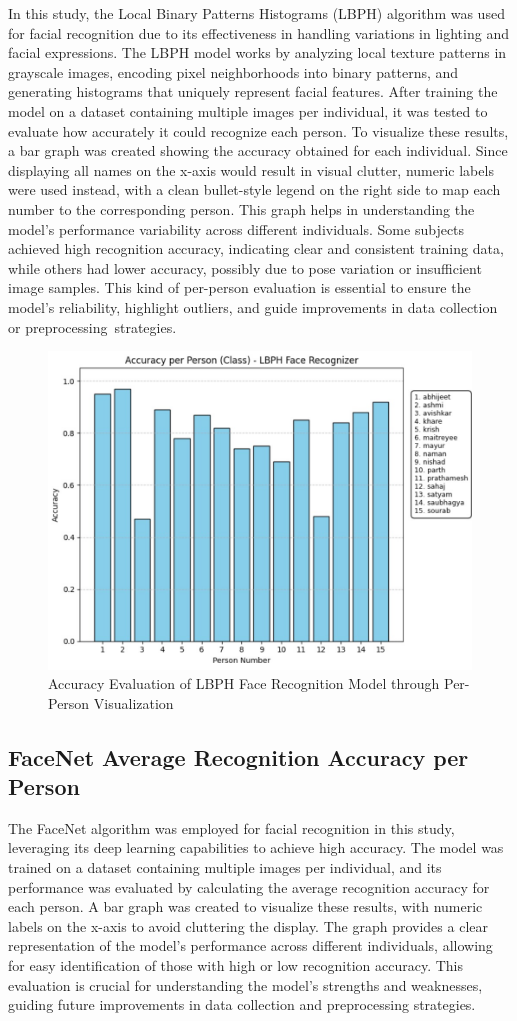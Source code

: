\documentclass[conference]{IEEEtran}
\begin{document}
In this study, the Local Binary Patterns Histograms (LBPH) algorithm was used for facial recognition due to its effectiveness in handling variations in lighting and facial expressions. The LBPH model works by analyzing local texture patterns in grayscale images, encoding pixel neighborhoods into binary patterns, and generating histograms that uniquely represent facial features. After training the model on a dataset containing multiple images per individual, it was tested to evaluate how accurately it could recognize each person. To visualize these results, a bar graph was created showing the accuracy obtained for each individual. Since displaying all names on the x-axis would result in visual clutter, numeric labels were used instead, with a clean bullet-style legend on the right side to map each number to the corresponding person. This graph helps in understanding the model's performance variability across different individuals. Some subjects achieved high recognition accuracy, indicating clear and consistent training data, while others had lower accuracy, possibly due to pose variation or insufficient image samples. This kind of per-person evaluation is essential to ensure the model's reliability, highlight outliers, and guide improvements in data collection or preprocessing strategies.
\begin{figure}[h]
    \centering
    \includegraphics[width=.45\textwidth]{accuracy per person.jpg}
    \caption{Accuracy Evaluation of LBPH Face Recognition Model through Per-Person Visualization}
    \label{fig:Accuracy per Person (Class) - LBPH Face Recognizer}
\end{figure}
\subsection{FaceNet Average Recognition Accuracy per Person }

The FaceNet algorithm was employed for facial recognition in this study, leveraging its deep learning capabilities to achieve high accuracy. The model was trained on a dataset containing multiple images per individual, and its performance was evaluated by calculating the average recognition accuracy for each person. A bar graph was created to visualize these results, with numeric labels on the x-axis to avoid cluttering the display. The graph provides a clear representation of the model's performance across different individuals, allowing for easy identification of those with high or low recognition accuracy. This evaluation is crucial for understanding the model's strengths and weaknesses, guiding future improvements in data collection and preprocessing strategies.
\end{document}
